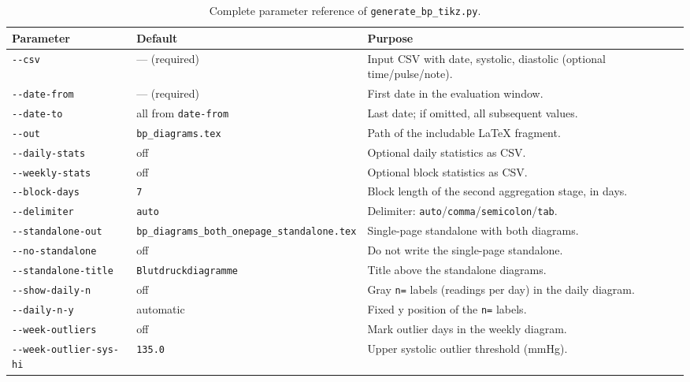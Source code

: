 \documentclass[conference]{IEEEtran}
\newcommand{\param}[1]{\texttt{#1}}
\begin{document}
\begin{table}[!t]
\caption{Complete parameter reference of \texttt{generate\_bp\_tikz.py}.}
\label{tab:params}
\centering
\footnotesize
\renewcommand{\arraystretch}{1.25}
\begin{tabular}{>{\raggedright\arraybackslash}p{} >{\raggedright\arraybackslash}p{} >{\raggedright\arraybackslash}p{}}
\toprule
\textbf{Parameter} & \textbf{Default} & \textbf{Purpose} \\
\midrule
\param{-{}-csv} & --- (required) & Input CSV with date, systolic, diastolic (optional time/pulse/note). \\
\param{-{}-date-from} & --- (required) & First date in the evaluation window. \\
\param{-{}-date-to} & all from \texttt{date-from} & Last date; if omitted, all subsequent values. \\
\param{-{}-out} & \texttt{bp\_diagrams.tex} & Path of the includable LaTeX fragment. \\
\param{-{}-daily-stats} & off & Optional daily statistics as CSV. \\
\param{-{}-weekly-stats} & off & Optional block statistics as CSV. \\
\param{-{}-block-days} & \texttt{7} & Block length of the second aggregation stage, in days. \\
\param{-{}-delimiter} & \texttt{auto} & Delimiter: \texttt{auto}/\texttt{comma}/\texttt{semicolon}/\texttt{tab}. \\
\param{-{}-standalone-out} & \texttt{bp\_\hspace{0pt}diagrams\_\hspace{0pt}both\_\hspace{0pt}onepage\_\hspace{0pt}standalone.tex} & Single-page standalone with both diagrams. \\
\param{-{}-no-standalone} & off & Do not write the single-page standalone. \\
\param{-{}-standalone-title} & \texttt{Blutdruckdiagramme} & Title above the standalone diagrams. \\
\param{-{}-show-daily-n} & off & Gray \texttt{n=} labels (readings per day) in the daily diagram. \\
\param{-{}-daily-n-y} & automatic & Fixed y position of the \texttt{n=} labels. \\
\param{-{}-week-outliers} & off & Mark outlier days in the weekly diagram. \\
\param{-{}-week-outlier-sys-hi} & \texttt{135.0} & Upper systolic outlier threshold (mmHg). \\

\end{tabular}
\end{table}
\end{document}
